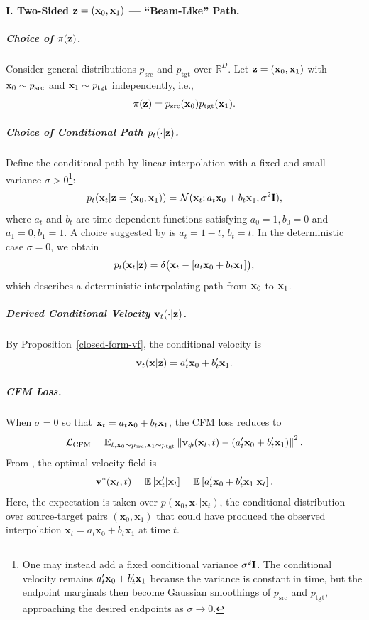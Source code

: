 \paragraph{I. Two-Sided ${\mathbf{z}} = ({\mathbf{x}}_0, {\mathbf{x}}_1)$ — ``Beam-Like'' Path.}
    \subparagraph{Choice of $\pi({\mathbf{z}})$.} Consider general distributions $p_{\mathrm{src}}$ and $p_{\mathrm{tgt}}$ over $\mathbb{R}^D$. Let ${\mathbf{z}} = ({\mathbf{x}}_0, {\mathbf{x}}_1)$ with ${\mathbf{x}}_0 \sim p_{\mathrm{src}}$ and ${\mathbf{x}}_1 \sim p_{\mathrm{tgt}}$ independently, i.e.,
    \[
    \pi({\mathbf{z}}) = p_{\mathrm{src}}({\mathbf{x}}_0)  p_{\mathrm{tgt}}({\mathbf{x}}_1).
    \]
    \subparagraph{Choice of Conditional Path $p_t(\cdot|{\mathbf{z}})$.} Define the conditional path by linear interpolation with a fixed and small variance $\sigma > 0$\footnote{
One may instead add a fixed conditional variance $\sigma^2{\mathbf{I}}$.
The conditional velocity remains $a_t'{\mathbf{x}}_0+b_t'{\mathbf{x}}_1$ because the
variance is constant in time, but the endpoint marginals then become Gaussian
smoothings of $p_{\mathrm{src}}$ and $p_{\mathrm{tgt}}$, approaching the
desired endpoints as $\sigma\to0$.
}:
    \[
    p_t({\mathbf{x}}_t | {\mathbf{z}} = ({\mathbf{x}}_0, {\mathbf{x}}_1)) = \mathcal{N}({\mathbf{x}}_t; a_t{\mathbf{x}}_0 + b_t{\mathbf{x}}_1,  \sigma^2 {\mathbf{I}}),
    \]
    where $a_t$ and $b_t$ are time-dependent functions satisfying  $a_0 = 1,  b_0 = 0$ and $a_1 = 0,  b_1 = 1$. A choice suggested by \citep{lipman2022flow,liu2022rectified} is $a_t = 1-t$, $b_t = t$.  In the deterministic case $\sigma = 0$, we obtain  
\[
p_t({\mathbf{x}}_t |{\mathbf{z}}) = \delta \big({\mathbf{x}}_t - [a_t{\mathbf{x}}_0 + b_t{\mathbf{x}}_1]\big),
\]
which describes a deterministic interpolating path from ${\mathbf{x}}_0$ to ${\mathbf{x}}_1$.
    \subparagraph{Derived Conditional Velocity  ${\mathbf{v}}_t(\cdot|{\mathbf{z}})$.} By Proposition~\ref{closed-form-vf}, the conditional velocity is
    \[
    {\mathbf{v}}_t({\mathbf{x}} | {\mathbf{z}}) = a'_t{\mathbf{x}}_0 + b'_t{\mathbf{x}}_1.
    \]
    \subparagraph{CFM Loss.} When $\sigma=0$ so that ${\mathbf{x}}_t = a_t{\mathbf{x}}_0 + b_t{\mathbf{x}}_1$, the CFM loss reduces to
    \[
    \mathcal{L}_{\mathrm{CFM}} = \mathbb{E}_{t, {\mathbf{x}}_0\sim p_{\text{src}}, {\mathbf{x}}_1\sim p_{\text{tgt}}} \left\| {\mathbf{v}}_{\bm{\phi}}({\mathbf{x}}_t, t) - \left(a'_t{\mathbf{x}}_0 + b'_t{\mathbf{x}}_1\right) \right\|^2.
    \]
From , the optimal velocity field is
\[
{\mathbf{v}}^*({\mathbf{x}}_t, t) = \mathbb{E} \left[ {\mathbf{x}}_t'|{\mathbf{x}}_t \right] = \mathbb{E} \left[ a'_t{\mathbf{x}}_0 + b'_t{\mathbf{x}}_1|{\mathbf{x}}_t \right].
\]
Here, the expectation is taken over $p(\mathbf{x}_0, \mathbf{x}_1|\mathbf{x}_t)$, the conditional distribution over source-target pairs $(\mathbf{x}_0, \mathbf{x}_1)$ that could have produced the observed interpolation $\mathbf{x}_t = a_t\mathbf{x}_0 + b_t\mathbf{x}_1$ at time $t$.



